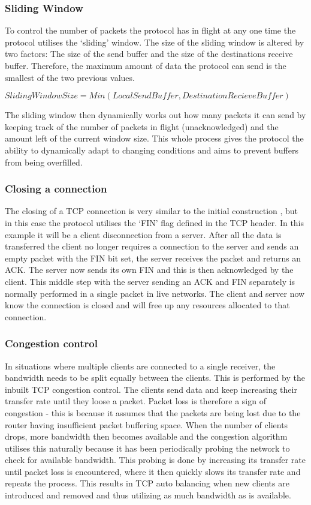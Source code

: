 \subsubsection*{Sliding Window}
\label{ref:window}
To control the number of packets the protocol has in flight at any one time the protocol utilises the `sliding' window. The size of the sliding window is altered by two factors: The size of the send buffer and the size of the destinations receive buffer. Therefore, the maximum amount of data the protocol can send is the smallest of the two previous values. 
\begin{center}
	$SlidingWindowSize = Min(LocalSendBuffer, DestinationRecieveBuffer)$
\end{center}
The sliding window then dynamically works out how many packets it can send by keeping track of the number of packets in flight (unacknowledged) and the amount left of the current window size. This whole process gives the protocol the ability to dynamically adapt to changing conditions and aims to prevent buffers from being overfilled.


\subsubsection*{Closing a connection}
The closing of a TCP connection is very similar to the initial construction \citep{TCP}, but in this case the protocol utilises the `FIN' flag defined in the TCP header. In this example it will be a client disconnection from a server. After all the data is transferred the client no longer requires a connection to the server and sends an empty packet with the FIN bit set, the server receives the packet and returns an ACK. The server now sends its own FIN and this is then acknowledged by the client. This middle step with the server sending an ACK and FIN separately is normally performed in a single packet in live networks. The client and server now know the connection is closed and will free up any resources allocated to that connection.



\subsubsection*{Congestion control}
\label{ref:tcpCongestion}
In situations where multiple clients are connected to a single receiver, the bandwidth needs to be split equally between the clients. This is performed by the inbuilt TCP congestion control. The clients send data and keep increasing their transfer rate until they loose a packet. Packet loss is therefore a sign of congestion - this is because it assumes that the packets are being lost due to the router having insufficient packet buffering space. When the number of clients drops, more bandwidth then becomes available and the congestion algorithm utilises this naturally because it has been periodically probing the network to check for available bandwidth. This probing is done by increasing its transfer rate until packet loss is encountered, where it then quickly slows its transfer rate and repeats the process. This results in TCP auto balancing when new clients are introduced and removed and thus utilizing as much bandwidth as is available.

